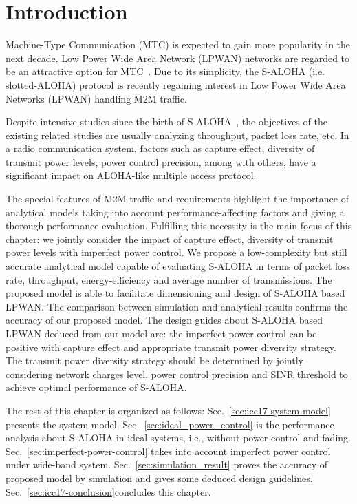\section{Introduction}
\label{sec:icc17-introduction}
Machine-Type Communication (MTC) is expected to gain more popularity in the next decade. Low Power Wide Area Network (LPWAN) networks are regarded to be an attractive option for MTC~\cite{goursaud2015dedicated}. Due to its simplicity, the S-ALOHA (i.e. slotted-ALOHA) protocol is recently regaining interest in Low Power Wide Area Networks (LPWAN) handling M2M traffic. 

Despite intensive studies since the birth of S-ALOHA~\cite{abramson1970aloha}, the objectives of the existing related studies are usually analyzing throughput, packet loss rate, etc. In a radio communication system, factors such as capture effect, diversity of transmit power levels, power control precision, among with others, have a significant impact on ALOHA-like multiple access protocol. 

The special features of M2M traffic and requirements highlight the importance of analytical models taking into account performance-affecting factors and giving a thorough performance evaluation.
Fulfilling this necessity is the main focus of this chapter: we jointly consider the impact of capture effect, diversity of transmit power levels with imperfect power control. We propose a low-complexity but still accurate analytical model capable of evaluating S-ALOHA in terms of packet loss rate, throughput, energy-efficiency and average number of transmissions. The proposed model is able to facilitate dimensioning and design of S-ALOHA based LPWAN. The comparison between simulation and analytical results confirms the accuracy of our proposed model. The design guides about S-ALOHA based LPWAN deduced from our model are: the imperfect power control can be positive with capture effect and appropriate transmit power diversity strategy. The transmit power diversity strategy should be determined by jointly considering network charges level, power control precision and SINR threshold to achieve optimal performance of S-ALOHA.

The rest of this chapter is organized as follows: Sec.~\ref{sec:icc17-system-model} presents the system model. Sec.~\ref{sec:ideal_power_control} is the performance analysis about S-ALOHA in ideal systems, i.e., without power control and fading. Sec.~\ref{sec:imperfect-power-control} takes into account imperfect power control under wide-band system. Sec.~\ref{sec:simulation_result} proves the accuracy of proposed model by simulation and gives some deduced design guidelines. Sec.~\ref{sec:icc17-conclusion}concludes this chapter.



